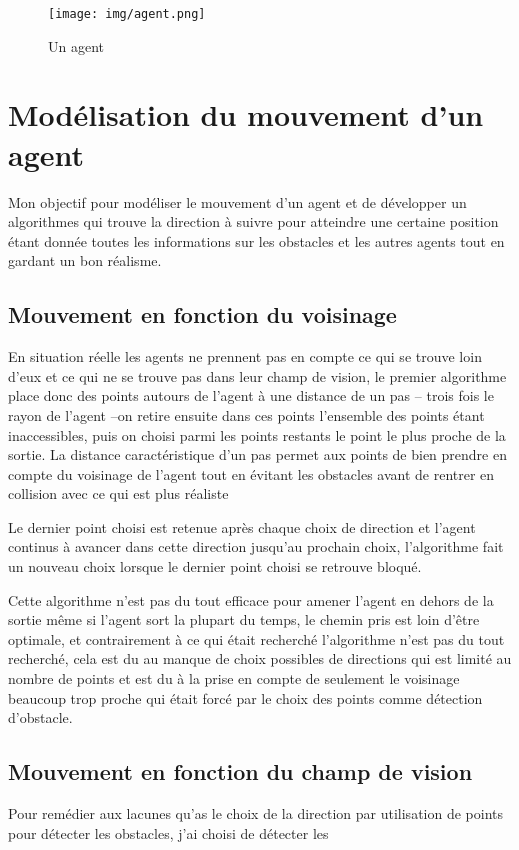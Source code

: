 \documentclass{article}
\begin{document}
\begin{figure}[h]
  \texttt{[image: img/agent.png]}
  \caption{Un agent}
  \label{fig:agent}
\end{figure}


\section{Modélisation du mouvement d'un agent}

Mon objectif pour modéliser le mouvement d'un agent et de développer
un algorithmes qui trouve la direction à suivre pour atteindre
une certaine position étant donnée toutes les informations sur les
obstacles et les autres agents tout en gardant un bon réalisme.

\subsection{Mouvement en fonction du voisinage}

En situation réelle les agents ne prennent pas en compte ce qui se trouve
loin d'eux et ce qui ne se trouve pas dans leur champ de vision, le premier
algorithme place donc des points autours de l'agent à une distance de un pas
-- trois fois le rayon de l'agent --on retire ensuite dans ces points l'ensemble
des points étant inaccessibles, puis on choisi parmi les points restants le
point le plus proche de la sortie. La distance caractéristique d'un pas permet
aux points de bien prendre en compte du voisinage de l'agent tout en
évitant les obstacles avant de rentrer en collision avec ce qui est plus réaliste

Le dernier point choisi est retenue après chaque choix de direction et
l'agent continus à avancer dans cette direction jusqu'au prochain choix,
l'algorithme fait un nouveau choix lorsque le dernier point choisi se
retrouve bloqué. 

Cette algorithme n'est pas du tout efficace pour amener l'agent en dehors
de la sortie même si l'agent sort la plupart du temps, le chemin pris
est loin d'être optimale, et contrairement à ce qui était recherché
l'algorithme n'est pas du tout recherché, cela est du au manque de choix
possibles de directions qui est limité au nombre de points et est du à la
prise en compte de seulement le voisinage beaucoup trop proche qui était
forcé par le choix des points comme détection d'obstacle.

\subsection{Mouvement en fonction du champ de vision}

Pour remédier aux lacunes qu'as le choix de la direction par utilisation
de points pour détecter les obstacles, j'ai choisi de détecter les 
\end{document}
